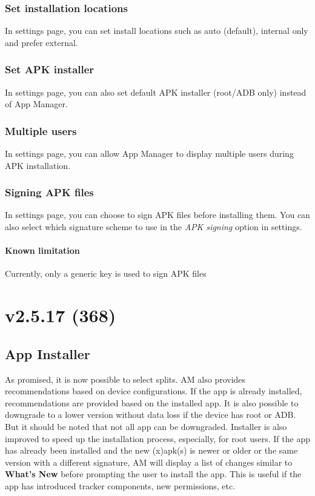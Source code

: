 \subsubsection{Set installation locations}
In settings page, you can set install locations such as auto (default), internal only and prefer external.

\subsubsection{Set APK installer}
In settings page, you can also set default APK installer (root/ADB only) instead of App Manager.

\subsubsection{Multiple users}
In settings page, you can allow App Manager to display multiple users during APK installation.

\subsubsection{Signing APK files}
In settings page, you can choose to sign APK files before installing them. You can also select which signature scheme
to use in the \textit{APK signing} option in settings.

\paragraph{Known limitation} Currently, only a generic key is used to sign APK files

\section{v2.5.17 (368)}

\subsection{App Installer}
As promised, it is now possible to select splits. AM also provides recommendations based on device configurations.
If the app is already installed, recommendations are provided based on the installed app. It is also possible to
downgrade to a lower version without data loss if the device has root or ADB. But it should be noted that not all app
can be downgraded. Installer is also improved to speed up the installation process, especially, for root users.
If the app has already been installed and the new (x)apk(s) is newer or older or the same version with a different
signature, AM will display a list of changes similar to \textbf{What's New} before prompting the user to install
the app. This is useful if the app has introduced tracker components, new permissions, etc.


